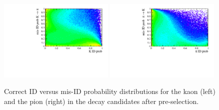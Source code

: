 %
\begin{figure}[h!]
\centering 
\includegraphics[width=0.49\textwidth]{RKst/figs/kaon_PID.pdf}
\includegraphics[width=0.49\textwidth]{RKst/figs/pion_PID.pdf}
\caption{Correct ID versus mis-ID probability distributions for 
the kaon (left) and the pion (right) in the decay candidates after pre-selection.}
\label{fig:k_pi_pid}
\end{figure}

